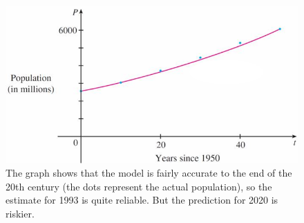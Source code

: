 \begin{frame}
\begin{figure}
\centering
\caption{The graph shows that the model is fairly accurate to the end of the 20th century (the dots represent the actual population), so the estimate for 1993 is quite reliable. But the prediction for 2020 is riskier.}
\label{fig:World}
\includegraphics[width=0.7\linewidth]{../../modules/exponential-growth-and-decay/pictures/World}
\end{figure}

\end{frame}
